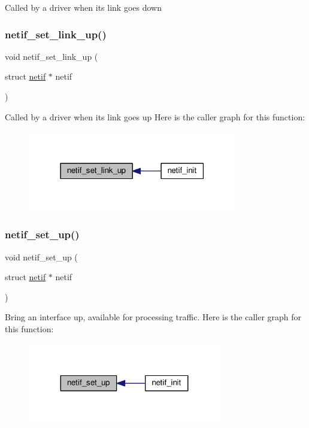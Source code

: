 Called by a driver when its link goes down \mbox{\label{group__netif_gae0d2975f189277990e9d5276fdd9e9ea}} 
\subsubsection{\texorpdfstring{netif\+\_\+set\+\_\+link\+\_\+up()}{netif\_set\_link\_up()}}
{\footnotesize\ttfamily void netif\+\_\+set\+\_\+link\+\_\+up (\begin{DoxyParamCaption}\item[{struct \hyperlink{structnetif}{netif} $\ast$}]{netif }\end{DoxyParamCaption})}

Called by a driver when its link goes up Here is the caller graph for this function\+:
\nopagebreak
\begin{figure}[H]
\begin{center}
\leavevmode
\includegraphics[width=259pt]{group__netif_gae0d2975f189277990e9d5276fdd9e9ea_icgraph}
\end{center}
\end{figure}
\mbox{\label{group__netif_gaf19693be401a265a52d2a56c65753121}} 
\subsubsection{\texorpdfstring{netif\+\_\+set\+\_\+up()}{netif\_set\_up()}}
{\footnotesize\ttfamily void netif\+\_\+set\+\_\+up (\begin{DoxyParamCaption}\item[{struct \hyperlink{structnetif}{netif} $\ast$}]{netif }\end{DoxyParamCaption})}

Bring an interface up, available for processing traffic. Here is the caller graph for this function\+:
\nopagebreak
\begin{figure}[H]
\begin{center}
\leavevmode
\includegraphics[width=239pt]{group__netif_gaf19693be401a265a52d2a56c65753121_icgraph}
\end{center}
\end{figure}
